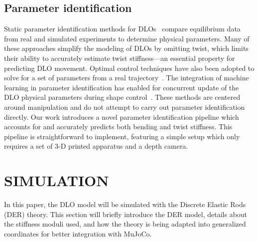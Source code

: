 \documentclass[letterpaper, 10 pt, conference]{ieeeconf}  %
\begin{document}
\subsection{Parameter identification}
Static parameter identification methods for DLOs~\cite{bartholdt2021parameter,liu2023robotic} compare equilibrium data from real and simulated experiments to determine physical parameters. Many of these approaches simplify the modeling of DLOs by omitting twist, which limits their ability to accurately estimate twist stiffness—an essential property for predicting DLO movement. Optimal control techniques have also been adopted to solve for a set of parameters from a real trajectory~\cite{caldwell2014optimal,yang2022learning}. The integration of machine learning in parameter identification has enabled for concurrent update of the DLO physical parameters during shape control~\cite{caporali2024deformable}. These methods are centered around manipulation and do not attempt to carry out parameter identification directly. Our work introduces a novel parameter identification pipeline which accounts for and accurately predicts both bending and twist stiffness. This pipeline is straightforward to implement, featuring a simple setup which only requires a set of 3-D printed apparatus and a depth camera.


\section{SIMULATION}
\label{section:ws}

In this paper, the DLO model will be simulated with the Discrete Elastic Rods (DER) \cite{bergou2008discrete} theory. This section will briefly introduce the DER model, details about the stiffness moduli used, and how the theory is being adapted into generalized coordinates for better integration with MuJoCo.
\end{document}

